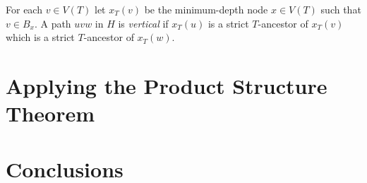 \documentclass[kpfonts]{patmorin}
\begin{document}
For each $v\in V(T)$ let $x_T(v)$ be the minimum-depth node $x\in V(T)$ such that $v\in B_x$.  A path $uvw$ in $H$ is \emph{vertical} if $x_T(u)$ is a strict $T$-ancestor of $x_T(v)$ which is a strict $T$-ancestor of $x_T(w)$.






\section{Applying the Product Structure Theorem}


\section{Conclusions}




\end{document}
